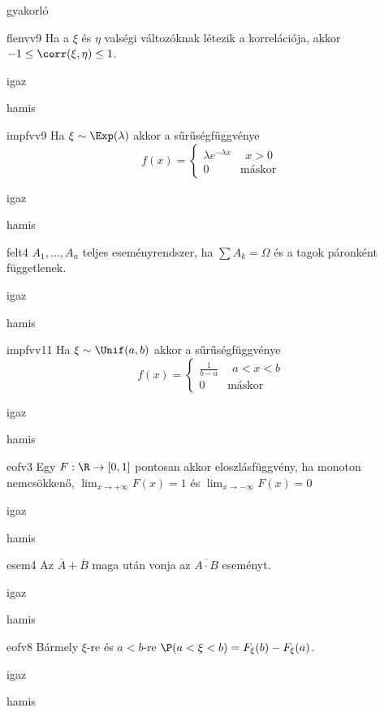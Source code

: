 \documentclass[12pt]{article}
\begin{document}
\begin{quiz}{gyakorló}
\begin{multi}[feedback={Tulajdonság,tétel.}]{flenvv9}
Ha a $\xi$ és $\eta$ valségi változóknak létezik a korrelációja, akkor $-1\le \corr(\xi,\eta)\le 1$.
\item* igaz
\item hamis
\end{multi}
\begin{multi}[feedback={Def.}]{impfvv9}
Ha $\xi\sim \Exp(\lambda)$ akkor a sűrűségfüggvénye 
$$
f(x)=
\begin{cases}
\lambda e^{-\lambda x}& \ \ x>0\\
0 & \text{máskor} 
\end{cases}
$$
\item* igaz
\item hamis
\end{multi}
\begin{multi}[feedback={Def.}]{felt4}
$A_1,\ldots,A_n$ teljes eseményrendszer, ha $\sum A_k=\Omega$ és a tagok páronként függetlenek.
\item igaz
\item* hamis
\end{multi}
\begin{multi}[feedback={Def.}]{impfvv11}
Ha $\xi\sim \Unif(a,b)$ akkor a sűrűségfüggvénye 
$$
f(x)=
\begin{cases}
\frac{1}{b-a} & \ \ a<x<b \\
0 & \text{máskor} 
\end{cases}
$$
\item* igaz
\item hamis
\end{multi}
\begin{multi}[feedback={A balról folytonosság kell.}]{eofv3}
Egy $F:\R\to [0,1]$ pontosan akkor eloszlásfüggvény, ha monoton nemcsökkenő, 
$\lim_{x\to+\infty}F(x)=1$ és $\lim_{x\to-\infty}F(x)=0$
\item igaz
\item* hamis
\end{multi}
\begin{multi}[feedback={de-Morgan azonosság}]{esem4}
Az $\overline{A} + \overline{B}$ maga után vonja az $\overline{A\cdot B}$ eseményt.
\item* igaz
\item hamis
\end{multi}
\begin{multi}[feedback={Diszkrét v.v.-ra ez nem feltétlen igaz, ha $a$-t pozitív valséggel felveszi.}]{eofv8}
Bármely $\xi$-re és $a<b$-re $\P(a< \xi <b)=F_{\xi}(b)-F_{\xi}(a)$.
\item igaz
\item* hamis

\end{multi}
\end{quiz}
\end{document}
